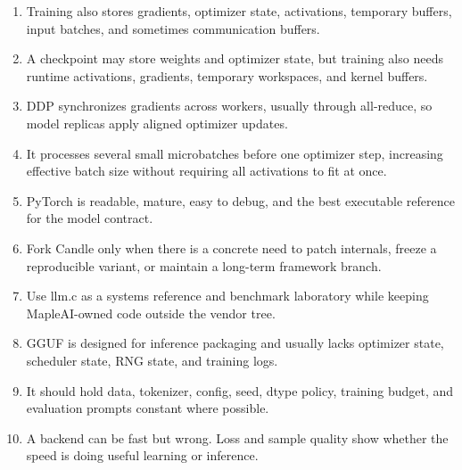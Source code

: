 \begin{enumerate}
  \item Training also stores gradients, optimizer state, activations, temporary buffers,
  input batches, and sometimes communication buffers.
  \item A checkpoint may store weights and optimizer state, but training also needs
  runtime activations, gradients, temporary workspaces, and kernel buffers.
  \item DDP synchronizes gradients across workers, usually through all-reduce, so model
  replicas apply aligned optimizer updates.
  \item It processes several small microbatches before one optimizer step, increasing
  effective batch size without requiring all activations to fit at once.
  \item PyTorch is readable, mature, easy to debug, and the best executable reference for
  the model contract.
  \item Fork Candle only when there is a concrete need to patch internals, freeze a
  reproducible variant, or maintain a long-term framework branch.
  \item Use llm.c as a systems reference and benchmark laboratory while keeping
  MapleAI-owned code outside the vendor tree.
  \item GGUF is designed for inference packaging and usually lacks optimizer state,
  scheduler state, RNG state, and training logs.
  \item It should hold data, tokenizer, config, seed, dtype policy, training budget, and
  evaluation prompts constant where possible.
  \item A backend can be fast but wrong. Loss and sample quality show whether the speed is
  doing useful learning or inference.
\end{enumerate}

